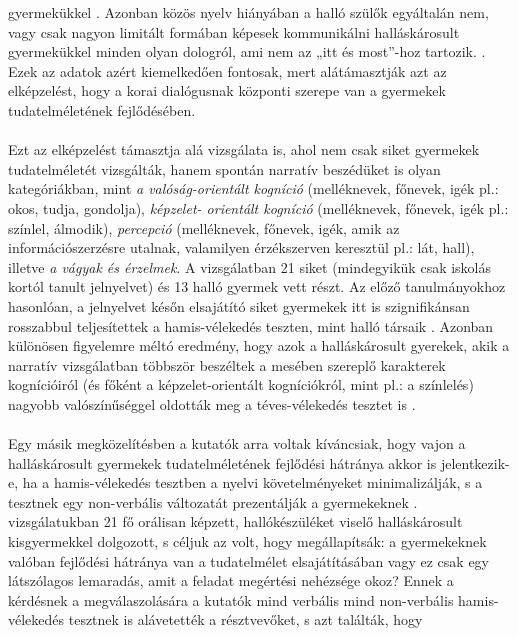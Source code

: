 gyermekükkel \autocite{peterson_siegal_1999}. Azonban közös nyelv hiányában a halló szülők egyáltalán nem, vagy
csak nagyon limitált formában képesek kommunikálni halláskárosult gyermekükkel minden
olyan dologról, ami nem az „itt és most”-hoz tartozik. \autocite{peterson_siegal_1999}. Ezek az adatok azért
kiemelkedően fontosak, mert alátámasztják azt az elképzelést, hogy a korai dialógusnak
központi szerepe van a gyermekek tudatelméletének fejlődésében. \\
\\
Ezt az elképzelést támasztja alá \textcite{peterson_slaughter_2006} vizsgálata is, ahol nem csak siket gyermekek
tudatelméletét vizsgálták, hanem spontán narratív beszédüket is olyan kategóriákban, mint \textit{a
	valóság-orientált kogníció} (melléknevek, főnevek, igék pl.: okos, tudja, gondolja), \textit{képzelet-
	orientált kogníció } (melléknevek, főnevek, igék pl.: színlel, álmodik), \textit{percepció} (melléknevek,
főnevek, igék, amik az információszerzésre utalnak, valamilyen érzékszerven keresztül pl.:
lát, hall), illetve \textit{a vágyak és érzelmek}. A vizsgálatban 21 siket (mindegyikük csak iskolás kortól
tanult jelnyelvet) és 13 halló gyermek vett részt. Az előző tanulmányokhoz hasonlóan, a
jelnyelvet későn elsajátító siket gyermekek itt is szignifikánsan rosszabbul teljesítettek a
hamis-vélekedés teszten, mint halló társaik \autocite{peterson_slaughter_2006}. Azonban különösen figyelemre méltó
eredmény, hogy azok a halláskárosult gyerekek, akik a narratív vizsgálatban többször
beszéltek a mesében szereplő karakterek kognícióiról (és főként a képzelet-orientált
kogní\-ciókról, mint pl.: a színlelés) nagyobb valószínűséggel oldották meg a téves-vélekedés
tesztet is \autocite{peterson_slaughter_2006}.\\
\\
Egy másik megközelítésben a kutatók arra voltak kíváncsiak, hogy vajon a halláskárosult
gyermekek tudatelméletének fejlődési hátránya akkor is jelentkezik-e, ha a hamis-vélekedés
tesztben a nyelvi követelményeket minimalizálják, s a tesztnek egy non-verbális válto\-zatát
prezentálják a gyermekeknek \autocite{figueras-costa_harris_2001}. \textcite{figueras-costa_harris_2001}
vizsgálatukban 21 fő orálisan képzett, hallókészüléket viselő halláskárosult kisgyermekkel
dolgozott, s céljuk az volt, hogy megállapítsák: a gyermekeknek valóban fejlődési hátránya
van a tudatelmélet elsajátításában vagy ez csak egy látszólagos lemaradás, amit a feladat
megértési nehézsége okoz? Ennek a kérdésnek a megválaszolására a kutatók mind verbális
mind non-verbális hamis-vélekedés tesztnek is alávetették a résztve\-vőket, s azt találták, hogy
